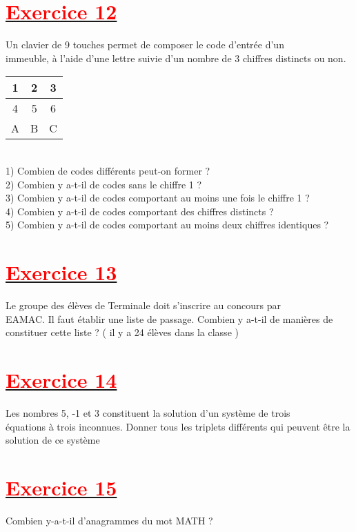 \documentclass[12pt]{article}
\begin{document}
\section*{\underline{\textbf{\textcolor{red}{Exercice 12}}}}
Un clavier de 9 touches permet de composer le code d’entrée d’un\\ immeuble, à l’aide d’une lettre suivie d’un nombre de 3 chiffres distincts ou non.\\
\begin{table}[h]
\centering
\begin{tabular}{|c|c|c|}
\hline
1 & 2 & 3 \\
\hline
4 & 5 & 6 \\
\hline
A & B & C \\
\hline
\end{tabular}
\end{table}\\
1) Combien de codes différents peut-on former ?\\
2) Combien y a-t-il de codes sans le chiffre 1 ?\\
3) Combien y a-t-il de codes comportant au moins une fois le chiffre 1 ?\\
4) Combien y a-t-il de codes comportant des chiffres distincts ?\\
5) Combien y a-t-il de codes comportant au moins deux chiffres identiques ?\\
\section*{\underline{\textbf{\textcolor{red}{Exercice 13}}}}
Le groupe des élèves de Terminale doit s'inscrire au concours par\\ EAMAC. Il faut établir une liste de passage. Combien y a-t-il de manières de constituer cette liste ? ( il y a 24 élèves dans la classe )
\section*{\underline{\textbf{\textcolor{red}{Exercice 14}}}}
Les nombres 5, -1 et 3 constituent la solution d’un système de trois\\ équations à trois inconnues. Donner tous les triplets différents qui peuvent être la solution de ce système
\section*{\underline{\textbf{\textcolor{red}{Exercice 15}}}}
Combien y-a-t-il d’anagrammes du mot MATH ?\\
\end{document}
